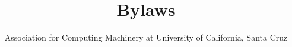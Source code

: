 \documentclass{article}
\begin{document}
\title{Bylaws}
\author{Association for Computing Machinery at University of California, Santa Cruz}
\date{}
\maketitle
\newpage

\tableofcontents
\newpage





\end{document}
